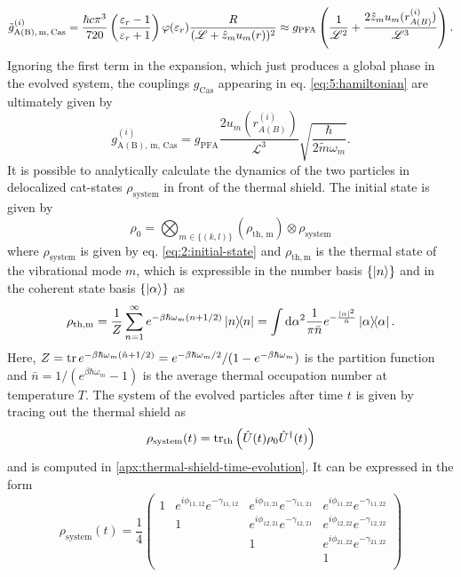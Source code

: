 \begin{equation}
  \tilde{g}^{(i)}_\mathrm{A(B),\,m,\,Cas} = \frac{\hbar c \pi^3}{720} \left(\frac{\varepsilon_r - 1}{\varepsilon_r + 1}\right)\varphi(\varepsilon_r) \frac{R}{(\mathscr{L} + \hat{z}_m u_m(r))^2} \approx g_\mathrm{PFA} \left(\frac{1}{\mathscr{L}^2} + \frac{2 \hat{z}_m u_m(r^{(i)}_{A(B)})}{\mathscr{L}^3}\right) .
\end{equation}
Ignoring the first term in the expansion, which just produces a global phase in the evolved system, the couplings $g_\mathrm{Cas}$ appearing in eq. \eqref{eq:5:hamiltonian} are ultimately given by
\begin{equation}
  g^{(i)}_\mathrm{A(B),\,m,\,Cas} = g_\mathrm{PFA} \frac{2u_m(r^{(i)}_{A(B)})}{\mathscr{L}^3} \sqrt{\frac{\hbar}{2 \tilde{m} \omega_m}} .
\end{equation}
It is possible to analytically calculate the dynamics of the two particles in delocalized cat-states $\rho_\mathrm{system}$ in front of the thermal shield.
The initial state is given by
\begin{equation}
  \rho_0 = \bigotimes_{m\in\{(k,l)\}} \left(\rho_\mathrm{th,\,m}\right) \otimes \rho_\mathrm{system}
\end{equation}
where $\rho_\mathrm{system}$ is given by eq. \eqref{eq:2:initial-state} and $\rho_\mathrm{th,m}$ is the thermal state of the vibrational mode $m$, which is expressible in the number basis $\left\{\ket{n}\right\}$ and in the coherent state basis $\left\{\ket{\alpha}\right\}$ as \cite{Steiner_2024}
\begin{equation}
  \rho_\mathrm{th,m} = \frac{1}{Z} \sum_{n=1}^{\infty} e^{-\beta \hbar \omega_m (n + 1/2)} \ketbra{n} = \int \dd \alpha^2 \frac{1}{\pi \bar{n}} e^{-\frac{\left\lvert\alpha\right\rvert^2}{\bar{n}}} \ketbra{\alpha} .
\end{equation}
Here, $Z = \tr e^{-\beta \hbar \omega_m (\hat{n}+1/2)} = e^{-\beta \hbar \omega_m/2}/(1-e^{-\beta \hbar \omega_m})$ is the partition function and $\bar{n} = 1/(e^{\beta \hbar \omega_m} - 1)$ is the average thermal occupation number at temperature $T$. 
The system of the evolved particles after time $t$ is given by tracing out the thermal shield as
\begin{equation}
  \rho_\mathrm{system}(t) = \tr_\mathrm{th} \left( \hat{U}(t) \rho_0 \hat{U}^\dagger(t) \right)  
\end{equation}
and is computed in \cref{apx:thermal-shield-time-evolution}. It can be expressed in the form
\begin{equation}
  \rho_\mathrm{system}(t) = \frac{1}{4} \begin{pmatrix}
    1 & e^{i\phi_{11,12}} e^{-\gamma_{11,12}} & e^{i\phi_{11,21}} e^{-\gamma_{11,21}} & e^{i\phi_{11,22}} e^{-\gamma_{11,22}} \\
    & 1 & e^{i\phi_{12,21}} e^{-\gamma_{12,21}} & e^{i\phi_{12,22}} e^{-\gamma_{12,22}} \\
    & & 1 & e^{i\phi_{21,22}} e^{-\gamma_{21,22}} \\
    & & & 1 \\
  \end{pmatrix}
\end{equation}
